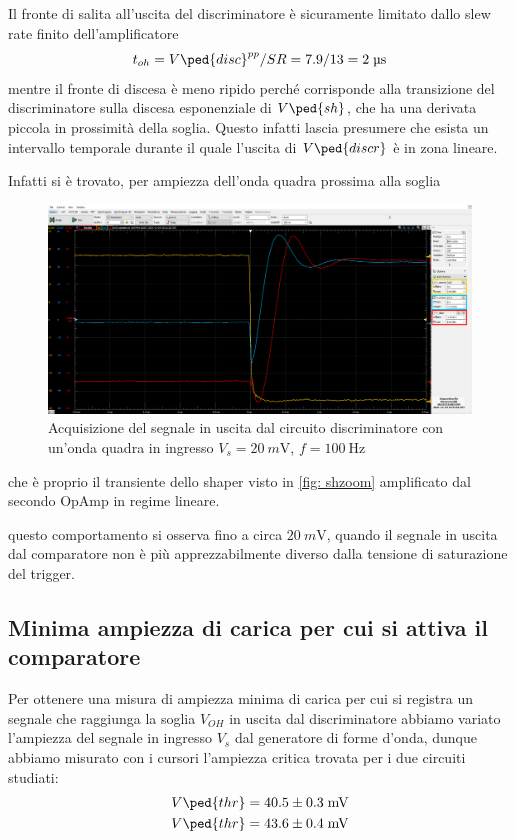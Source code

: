 \documentclass[10pt,a4paper]{article}
\begin{document}
Il fronte di salita all'uscita del discriminatore è sicuramente limitato dallo
slew rate finito dell'amplificatore
\[
t_{oh} = V\ped{disc}^{pp}/SR = 7.9 / 13 = 2 \; \si{\micro\s}
\]
mentre il fronte di discesa è meno ripido perché corrisponde alla transizione
del discriminatore sulla discesa esponenziale di $V\ped{sh}$, che ha una derivata
piccola in prossimità della soglia. Questo infatti lascia presumere che esista
un intervallo temporale durante il quale l'uscita di $V\ped{discr}$ è in zona
lineare.

Infatti si è trovato, per ampiezza dell'onda quadra prossima alla soglia
\begin{figure}[htbp]
\centering
\includegraphics[scale=0.335]{shdiscthr}
\caption{Acquisizione del segnale in uscita dal circuito discriminatore con
un'onda quadra in ingresso $V_s = \SI{20}{m\V}$, $f = \SI{100}{\Hz}$
\label{fig: discrthr}}
\end{figure}
che è proprio il transiente dello shaper visto in \ref{fig: shzoom} amplificato
dal secondo OpAmp in regime lineare.

questo comportamento si osserva fino a circa $\SI{20}{m\V}$, quando il segnale
in uscita dal comparatore non è più apprezzabilmente diverso dalla tensione di
saturazione del trigger.

\subsection{Minima ampiezza di carica per cui si attiva il comparatore}
Per ottenere una misura di ampiezza minima di carica per cui si registra un
segnale che raggiunga la soglia $V_{OH}$ in uscita dal discriminatore abbiamo
variato l'ampiezza del segnale in ingresso $V_s$ dal generatore di forme
d'onda, dunque abbiamo misurato con i cursori l'ampiezza critica trovata per
i due circuiti studiati:
\begin{align*}
V\ped{thr} &= 40.5 \pm 0.3 \; \si{m\V} \\ 
V\ped{thr} &= 43.6 \pm 0.4 \; \si{m\V}
\end{align*}
\end{document}
